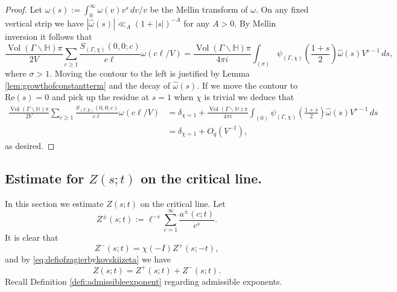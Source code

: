 \documentclass{article}
\theoremstyle{named}
\newcommand{\Hyp}{\mathbb{H}}
\DeclareMathOperator{\vol}{Vol}
\begin{document}
\begin{proof}
Let $\widehat{\omega}(s) := \int_0^\infty \omega(v)v^s \, dv/v$ be the Mellin transform of $\omega$. On any fixed vertical strip we have $|\widehat{\omega}(s)| \ll_A (1 + |s|)^{-A}$ for any $A > 0$. By Mellin inversion it follows that  
\begin{equation*}
    \frac{\vol(\Gamma\backslash \Hyp)\pi}{2V}\sum_{c \geq 1} \frac{S_{(\Gamma, \chi)}(0, 0; c)}{c\ell}\omega(c\ell/V) = \frac{\vol(\Gamma\backslash \Hyp)\pi}{4\pi i}\int_{(\sigma)} \psi_{(\Gamma, \chi)}\left(\frac{1 + s}{2}\right)\widehat{\omega}(s)V^{s-1}\, ds,
\end{equation*}
where $\sigma > 1$. Moving the contour to the left is justified by Lemma \ref{lem:growthofconstantterm} and the decay of $\widehat{\omega}(s)$. If we move the contour to $\text{Re}(s) = 0$ and pick up the residue at $s = 1$ when $\chi$ is trivial we deduce that 
\begin{equation*}
\begin{aligned}
\frac{\vol(\Gamma\backslash \Hyp)\pi}{2V}\sum_{c \geq 1} \frac{S_{(\Gamma, \chi)}(0, 0; c)}{c\ell}\omega(c\ell/V) & = \delta_{\chi = 1} + \frac{\vol(\Gamma\backslash \Hyp)\pi}{4\pi i}\int_{(0)} \psi_{(\Gamma, \chi)}\left(\frac{1 + s}{2}\right)\widehat{\omega}(s)V^{s-1}\, ds\\
& = \delta_{\chi = 1} + O_q(V^{-1}),
\end{aligned}
\end{equation*} 
as desired.
\end{proof}





\subsection{Estimate for $Z(s; t)$ on the critical line.}

In this section we estimate $Z(s; t)$ on the critical line. Let 
\begin{equation*}
    Z^{\pm}(s; t) := \ell^{-s}\sum_{c = 1}^\infty \frac{a^{\pm}(c; t)}{c^s}.
\end{equation*}
It is clear that 
\begin{equation}\label{eq:pmzetafunction}
    Z^{-}(s; t) = \chi(-I)Z^{+}(s; -t),
\end{equation}
and by \eqref{eq:defiofzagierbykovskiizeta} we have 
\begin{equation*}
    Z(s; t) = Z^{+}(s; t) + Z^{-}(s; t).
\end{equation*}
Recall Definition \ref{defi:admissibleexponent} regarding admissible exponents.
\end{document}
